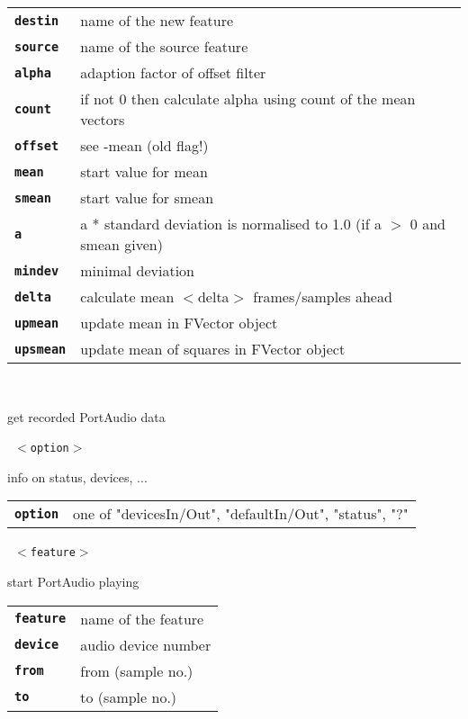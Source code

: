 \begin{description}
\begin{description}
      \begin{tabular}{ll}
 \texttt{\textbf{destin}} &  name of the new feature \\
 \texttt{\textbf{source}} &  name of the source feature \\
 \texttt{\textbf{alpha}} &    adaption factor of offset filter  \\
 \texttt{\textbf{count}} &    if not 0 then calculate alpha using count of the mean vectors  \\
 \texttt{\textbf{offset}} &   see -mean (old flag!)  \\
 \texttt{\textbf{mean}} &     start value for mean  \\
 \texttt{\textbf{smean}} &    start value for smean  \\
 \texttt{\textbf{a}} &        a * standard deviation is normalised to 1.0 (if a $>$ 0 and smean given)  \\
 \texttt{\textbf{mindev}} &   minimal deviation  \\
 \texttt{\textbf{delta}} &    calculate mean $<$delta$>$ frames/samples ahead  \\
 \texttt{\textbf{upmean}} &   update mean in FVector object  \\
 \texttt{\textbf{upsmean}} &  update mean of squares  in FVector object  \\
      \end{tabular}
       \texttt{} \

        get recorded PortAudio data

       \texttt{ $<$option$>$} \

        info on status, devices, ...

      \begin{tabular}{ll}
 \texttt{\textbf{option}} &  one of {"devicesIn/Out", "defaultIn/Out", "status", "?"}  \\
      \end{tabular}
       \texttt{ $<$feature$>$   } \

        start PortAudio playing

      \begin{tabular}{ll}
 \texttt{\textbf{feature}} &  name of the feature  \\
 \texttt{\textbf{device}} &    audio device number  \\
 \texttt{\textbf{from}} &      from (sample no.)  \\
 \texttt{\textbf{to}} &        to (sample no.)  \\
      \end{tabular}
       \texttt{      } \


\end{description}
\end{description}
